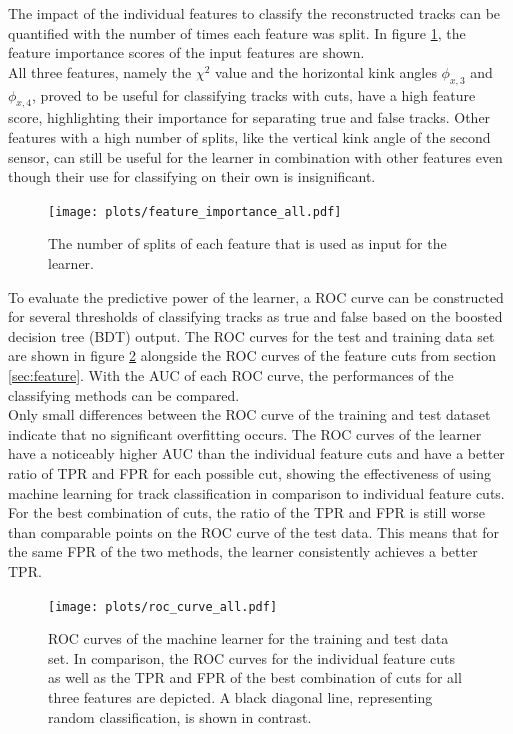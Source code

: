 The impact of the individual features to classify the reconstructed tracks can be quantified with the number of times each feature was split.
In figure \ref{fig:importance}, the feature importance scores of the input features are shown. \\
All three features, namely the $\chi^2$ value and the horizontal kink angles  $\phi_{x,3}$ and $\phi_{x,4}$,
proved to be useful for classifying tracks with cuts, have a high feature score, highlighting their importance for separating true and false tracks.
Other features with a high number of splits, like the vertical kink angle of the second sensor,
can still be useful for the learner in combination with other features even though their use for classifying on their own is insignificant.
\begin{figure}
  \centering
  \texttt{[image: plots/feature\_importance\_all.pdf]}
  \caption{The number of splits of each feature that is used as input for the learner.}
  \label{fig:importance}
\end{figure}

To evaluate the predictive power of the learner, a ROC curve can be constructed for several thresholds of classifying tracks as true and false based on the
boosted decision tree (BDT) output.
The ROC curves for the test and training data set are shown in figure \ref{fig:auc_comparison} alongside
the ROC curves of the feature cuts from section \ref{sec:feature}.
With the AUC of each ROC curve, the performances of the classifying methods can be compared. \\%
Only small differences between the ROC curve of the training and test dataset indicate that no significant overfitting occurs.
The ROC curves of the learner have a noticeably higher AUC than the individual feature cuts and have a better ratio of
TPR and FPR for each possible cut, showing the effectiveness
of using machine learning for track classification in comparison to individual feature cuts. For the best combination of cuts, the ratio of the TPR and FPR is still worse than
comparable points on the ROC curve of the test data. This means that for the same FPR of the two methods, the learner consistently achieves a better TPR.

\begin{figure}
  \centering
  \texttt{[image: plots/roc\_curve\_all.pdf]}
    \caption{ROC curves of the machine learner for the training and test data set. In comparison, the ROC curves for the individual feature cuts as well as the
    TPR and FPR of the best combination of cuts for all three features are depicted. A black diagonal line, representing random classification, is shown
    in contrast.}
  \label{fig:auc_comparison}
\end{figure}

